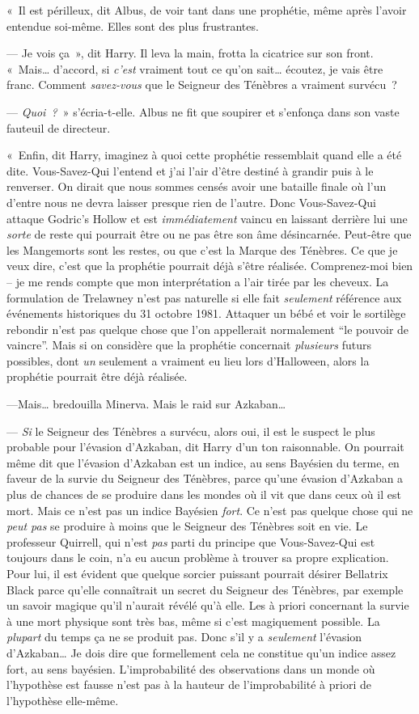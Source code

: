 «~Il est périlleux, dit Albus, de voir tant dans une prophétie, même après l'avoir entendue soi-même. Elles sont des plus frustrantes.

--- Je vois ça~», dit Harry. Il leva la main, frotta la cicatrice sur son front. «~Mais… d'accord, si \emph{c'est} vraiment tout ce qu'on sait… écoutez, je vais être franc. Comment \emph{savez-vous} que le Seigneur des Ténèbres a vraiment survécu~?

--- \emph{Quoi~?}~» s'écria-t-elle. Albus ne fit que soupirer et s'enfonça dans son vaste fauteuil de directeur.

«~Enfin, dit Harry, imaginez à quoi cette prophétie ressemblait quand elle a été dite. Vous-Savez-Qui l'entend et j'ai l'air d'être destiné à grandir puis à le renverser. On dirait que nous sommes censés avoir une bataille finale où l'un d'entre nous ne devra laisser presque rien de l'autre. Donc Vous-Savez-Qui attaque Godric's Hollow et est \emph{immédiatement} vaincu en laissant derrière lui une \emph{sorte} de reste qui pourrait être ou ne pas être son âme désincarnée. Peut-être que les Mangemorts sont les restes, ou que c'est la Marque des Ténèbres. Ce que je veux dire, c'est que la prophétie pourrait déjà s'être réalisée. Comprenez-moi bien -- je me rends compte que mon interprétation a l'air tirée par les cheveux. La formulation de Trelawney n'est pas naturelle si elle fait \emph{seulement} référence aux événements historiques du 31 octobre 1981. Attaquer un bébé et voir le sortilège rebondir n'est pas quelque chose que l'on appellerait normalement “le pouvoir de vaincre”. Mais si on considère que la prophétie concernait \emph{plusieurs} futurs possibles, dont \emph{un} seulement a vraiment eu lieu lors d'Halloween, alors la prophétie pourrait être déjà réalisée.

---Mais… bredouilla Minerva. Mais le raid sur Azkaban…

--- \emph{Si} le Seigneur des Ténèbres a survécu, alors oui, il est le suspect le plus probable pour l'évasion d'Azkaban, dit Harry d'un ton raisonnable. On pourrait même dit que l'évasion d'Azkaban est un indice, au sens Bayésien du terme, en faveur de la survie du Seigneur des Ténèbres, parce qu'une évasion d'Azkaban a plus de chances de se produire dans les mondes où il vit que dans ceux où il est mort. Mais ce n'est pas un indice Bayésien \emph{fort}. Ce n'est pas quelque chose qui ne \emph{peut pas} se produire à moins que le Seigneur des Ténèbres soit en vie. Le professeur Quirrell, qui n'est \emph{pas} parti du principe que Vous-Savez-Qui est toujours dans le coin, n'a eu aucun problème à trouver sa propre explication. Pour lui, il est évident que quelque sorcier puissant pourrait désirer Bellatrix Black parce qu'elle connaîtrait un secret du Seigneur des Ténèbres, par exemple un savoir magique qu'il n'aurait révélé qu'à elle. Les à priori concernant la survie à une mort physique sont très bas, même si c'est magiquement possible. La \emph{plupart} du temps ça ne se produit pas. Donc s'il y a \emph{seulement} l'évasion d'Azkaban… Je dois dire que formellement cela ne constitue qu'un indice assez fort, au sens bayésien. L'improbabilité des observations dans un monde où l'hypothèse est fausse n'est pas à la hauteur de l'improbabilité à priori de l'hypothèse elle-même.

